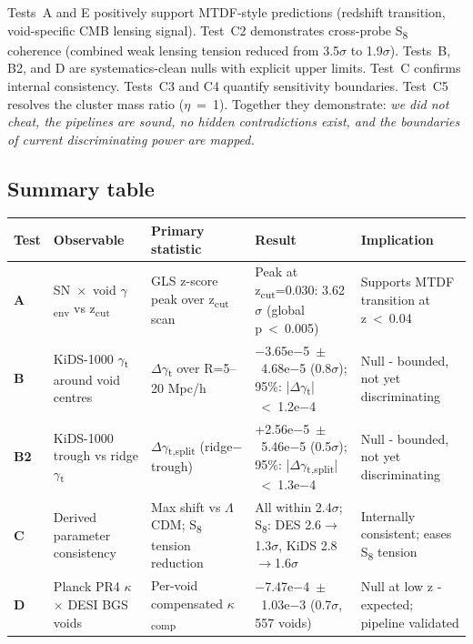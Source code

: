 \documentclass[11pt,a4paper]{article}
\begin{document}
Tests~A and E positively support MTDF-style predictions (redshift transition, void-specific CMB lensing signal). Test~C2 demonstrates cross-probe S\textsubscript{8} coherence (combined weak lensing tension reduced from 3.5$\sigma$ to 1.9$\sigma$). Tests~B, B2, and D are systematics-clean nulls with explicit upper limits. Test~C confirms internal consistency. Tests~C3 and C4 quantify sensitivity boundaries. Test~C5 resolves the cluster mass ratio ($\eta$~=~1). Together they demonstrate: \emph{we did not cheat, the pipelines are sound, no hidden contradictions exist, and the boundaries of current discriminating power are mapped.}

\subsection{Summary table}
\begin{table}[H]
\centering
\footnotesize
\begin{tabularx}{\linewidth}{l>{\RaggedRight\arraybackslash}X>{\RaggedRight\arraybackslash}X>{\RaggedRight\arraybackslash}X>{\RaggedRight\arraybackslash}X}
\toprule
\textbf{Test} & \textbf{Observable} & \textbf{Primary statistic} & \textbf{Result} & \textbf{Implication} \tabularnewline
\midrule
\textbf{A} & SN~$\times$~void $\gamma$\textsubscript{env} vs z\textsubscript{cut} & GLS z-score peak over z\textsubscript{cut} scan & Peak at z\textsubscript{cut}=0.030: 3.62$\sigma$ (global p~<~0.005) & Supports MTDF transition at z~<~0.04 \tabularnewline
\textbf{B} & KiDS-1000 $\gamma$\textsubscript{t} around void centres & $\Delta$$\gamma$\textsubscript{t} over R=5--20 Mpc/\allowbreak{}h & $-$3.65e$-$5~$\pm$~4.68e$-$5 (0.8$\sigma$); 95\%: |$\Delta$$\gamma$\textsubscript{t}|~<~1.2e$-$4 & Null  -  bounded, not yet discriminating \tabularnewline
\textbf{B2} & KiDS-1000 trough vs ridge $\gamma$\textsubscript{t} & $\Delta$$\gamma$\textsubscript{t,split} (ridge$-$trough) & +2.56e$-$5~$\pm$~5.46e$-$5 (0.5$\sigma$); 95\%: |$\Delta$$\gamma$\textsubscript{t,split}|~<~1.3e$-$4 & Null  -  bounded, not yet discriminating \tabularnewline
\textbf{C} & Derived parameter consistency & Max shift vs $\Lambda$CDM; S\textsubscript{8} tension reduction & All within 2.4$\sigma$; S\textsubscript{8}: DES 2.6$\rightarrow$1.3$\sigma$, KiDS 2.8$\rightarrow$1.6$\sigma$ & Internally consistent; eases S\textsubscript{8} tension \tabularnewline
\textbf{D} & Planck PR4 $\kappa$ $\times$ DESI BGS voids & Per-void compensated $\kappa$\textsubscript{comp} & $-$7.47e$-$4~$\pm$~1.03e$-$3 (0.7$\sigma$, 557 voids) & Null at low z  -  expected; pipeline validated \tabularnewline

\end{tabularx}
\end{table}
\end{document}
